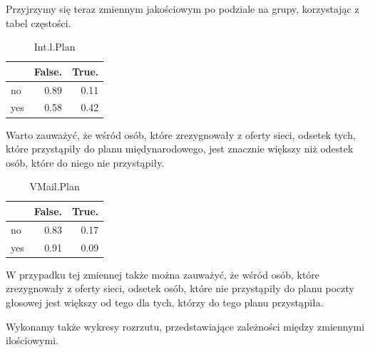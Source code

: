 \documentclass{article}\usepackage[]{graphicx}\usepackage[]{color}
\newenvironment{knitrout}{}{} %
\begin{document}
\vspace{0.3cm}

Przyjrzymy się teraz zmiennym jakościowym po podziale na grupy, korzystając z tabel częstości.

\begin{knitrout}
\color{fgcolor}\begin{table}[H]

\caption{\label{tab:plan miedzynarodowy}Int.l.Plan}
\centering
\begin{tabular}[t]{l|r|r}
\hline
  & False. & True.\\
\hline
no & 0.89 & 0.11\\
\hline
yes & 0.58 & 0.42\\
\hline
\end{tabular}
\end{table}


\end{knitrout}

Warto zauważyć, że wśród osób, które zrezygnowały z oferty sieci, odsetek tych, które przystąpiły do planu międynarodowego, jest znacznie większy niż odestek osób, które do niego nie przystąpiły.

\begin{knitrout}
\color{fgcolor}\begin{table}[H]

\caption{\label{tab:plan poczty glosowej}VMail.Plan}
\centering
\begin{tabular}[t]{l|r|r}
\hline
  & False. & True.\\
\hline
no & 0.83 & 0.17\\
\hline
yes & 0.91 & 0.09\\
\hline
\end{tabular}
\end{table}


\end{knitrout}

W przypadku tej zmiennej także można zauważyć, że wśród osób, które zrezygnowały z oferty sieci, odsetek osób, które nie przystąpiły do planu poczty głosowej jest większy od tego dla tych, którzy do tego planu przystąpiła.

\vspace{0.3cm}

Wykonamy także wykresy rozrzutu, przedstawiające zależności między zmiennymi ilościowymi.
\end{document}
